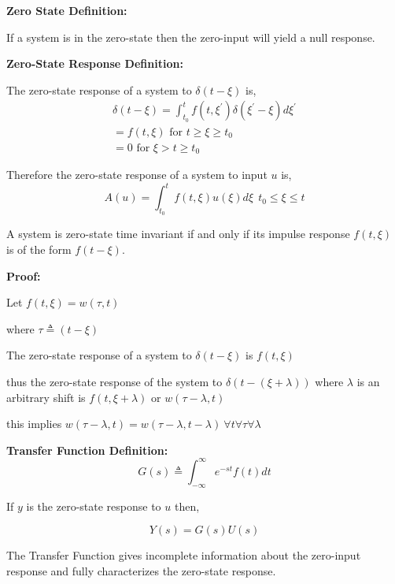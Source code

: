 \documentclass[a4paper, 11 pt]{article}
\begin{document}
\textbf{Zero State Definition:}

If a system is in the zero-state then the zero-input will yield a null response. 

\textbf{Zero-State Response Definition:}

The zero-state response of a system to $\delta(t-\xi)$ is, 
\begin{equation}
  \begin{split}
  \delta(t-\xi) = \int_{t_{0}}^{t} f(t, \xi^{'})\delta(\xi^{'}-\xi)d\xi^{'} \\
   = f(t, \xi) \text{ for } t \geq \xi \geq t_{0} \\
   = 0 \text{ for } \xi > t \geq t_{0}
 \end{split}
\end{equation}

Therefore the zero-state response of a system to input $u$ is, 
\begin{equation}
  A(u) = \int_{t_{0}}^{t}f(t,\xi)u(\xi)d\xi \ \ t_{0} \leq \xi \leq t
\end{equation}

A system is zero-state time invariant if and only if its impulse response $f(t,\xi)$ is of the form $f(t-\xi)$. 

\textbf{Proof:}

    Let $f(t,\xi) = w(\tau, t)$

    where $\tau \triangleq (t -\xi)$

    The zero-state response of a system to $\delta(t-\xi)$ is $f(t,\xi)$

    thus the zero-state response of the system to $\delta(t -(\xi + \lambda))$ where $\lambda$ is an arbitrary shift is $f(t, \xi + \lambda)$ or $w(\tau -\lambda,t)$

    this implies $w(\tau - \lambda, t) = w(\tau - \lambda, t - \lambda) \ \forall t \forall \tau \forall \lambda$

\textbf{Transfer Function Definition:}
\begin{equation}
  G(s) \triangleq \int_{-\infty}^{\infty} e^{-st}f(t)dt
\end{equation}

If $y$ is the zero-state response to $u$ then, 

\begin{equation}
  Y(s) = G(s)U(s)
\end{equation}

The Transfer Function gives incomplete information about the zero-input response and fully characterizes the zero-state response. 
\end{document}
